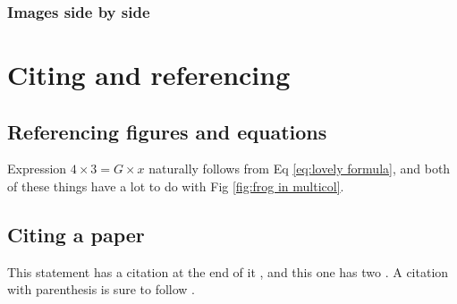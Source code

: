 \documentclass{article}
\begin{document}
\lipsum[7]

\subsubsection{Images side by side}

\section{Citing and referencing}

\subsection{Referencing figures and equations}
 Expression $4\times 3=G\times x$ naturally follows from Eq \ref{eq:lovely formula}, and both of these things have a lot to do with Fig \ref{fig:frog in multicol}.
 
 \subsection{Citing a paper}
This statement has a citation at the end of it \cite{toadetal1958}, and this one has two \cite{toadetal1958, squeaker1982}. A citation with parenthesis is sure to follow \citep{siddiqi2004interspecific}.

 




\end{document}
